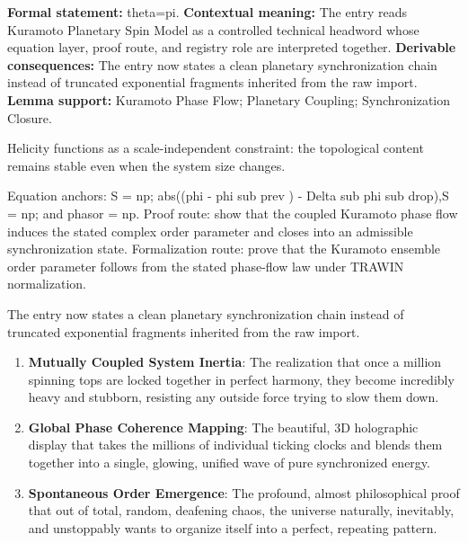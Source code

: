 \begingroup\footnotesize\setlength{\emergencystretch}{3em}\sloppy
\textbf{Formal statement:} theta=pi. \textbf{Contextual meaning:} The entry reads Kuramoto Planetary Spin Model as a controlled technical headword whose equation layer, proof route, and registry role are interpreted together. \textbf{Derivable consequences:} The entry now states a clean planetary synchronization chain instead of truncated exponential fragments inherited from the raw import. \textbf{Lemma support:} Kuramoto Phase Flow; Planetary Coupling; Synchronization Closure.\par
\endgroup

Helicity functions as a scale-independent constraint: the topological content remains stable even when the system size changes.

Equation anchors: S = np; abs((phi - phi sub prev ) - Delta sub phi sub drop),S = np; and phasor = np. Proof route: show that the coupled Kuramoto phase flow induces the stated complex order parameter and closes into an admissible synchronization state. Formalization route: prove that the Kuramoto ensemble order parameter follows from the stated phase-flow law under TRAWIN normalization.

The entry now states a clean planetary synchronization chain instead of truncated exponential fragments inherited from the raw import.
\endgroup

\begin{enumerate}[leftmargin=1.6em,itemsep=6pt,topsep=4pt]
\item \textbf{Mutually Coupled System Inertia}: The realization that once a million spinning tops are locked together in perfect harmony, they become incredibly heavy and stubborn, resisting any outside force trying to slow them down.
\item \textbf{Global Phase Coherence Mapping}: The beautiful, 3D holographic display that takes the millions of individual ticking clocks and blends them together into a single, glowing, unified wave of pure synchronized energy.
\item \textbf{Spontaneous Order Emergence}: The profound, almost philosophical proof that out of total, random, deafening chaos, the universe naturally, inevitably, and unstoppably wants to organize itself into a perfect, repeating pattern.
\end{enumerate}

